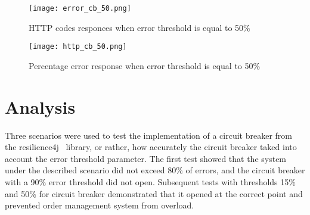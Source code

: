 \begin{figure}[t]
    \centering
    \texttt{[image: error\_cb\_50.png]}
    \caption{HTTP codes responces when error threshold is equal to 50\%}
    \label{fig:error-cb-50}
\end{figure}

\begin{figure}[t]
    \centering
    \texttt{[image: http\_cb\_50.png]}
    \caption{Percentage error response when error threshold is equal to 50\%}
    \label{fig:http-cb-50}
\end{figure}

\section{Analysis}\label{sec:analysis}
Three scenarios were used to test the implementation of a circuit breaker from the resilience4j~\cite{resilience4j} library, or
rather, how accurately the circuit breaker taked into account the error threshold parameter. The first test showed that the system
under the described scenario did not exceed 80\% of errors, and the circuit breaker with a 90\% error threshold did not
open. Subsequent tests with thresholds 15\% and 50\% for circuit breaker demonstrated that it opened
at the correct point and prevented order management system from overload.

